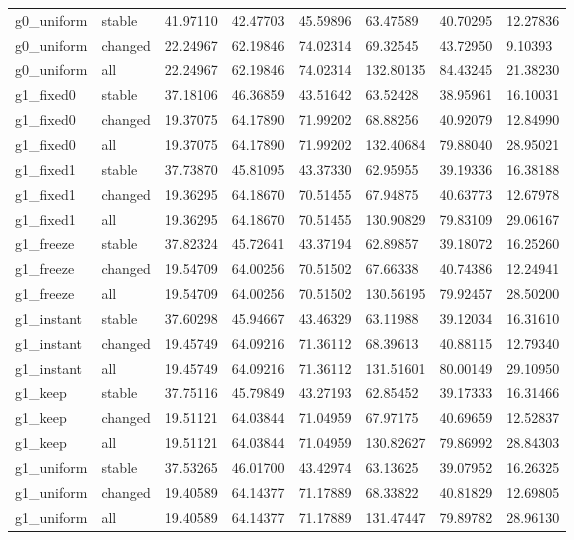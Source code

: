 \begin{longtable}{llllllll}
g0\_uniform & stable & 41.97110 & 42.47703 & 45.59896 & 63.47589 & 40.70295 & 12.27836 \\
g0\_uniform & changed & 22.24967 & 62.19846 & 74.02314 & 69.32545 & 43.72950 & 9.10393 \\
g0\_uniform & all & 22.24967 & 62.19846 & 74.02314 & 132.80135 & 84.43245 & 21.38230 \\
g1\_fixed0 & stable & 37.18106 & 46.36859 & 43.51642 & 63.52428 & 38.95961 & 16.10031 \\
g1\_fixed0 & changed & 19.37075 & 64.17890 & 71.99202 & 68.88256 & 40.92079 & 12.84990 \\
g1\_fixed0 & all & 19.37075 & 64.17890 & 71.99202 & 132.40684 & 79.88040 & 28.95021 \\
g1\_fixed1 & stable & 37.73870 & 45.81095 & 43.37330 & 62.95955 & 39.19336 & 16.38188 \\
g1\_fixed1 & changed & 19.36295 & 64.18670 & 70.51455 & 67.94875 & 40.63773 & 12.67978 \\
g1\_fixed1 & all & 19.36295 & 64.18670 & 70.51455 & 130.90829 & 79.83109 & 29.06167 \\
g1\_freeze & stable & 37.82324 & 45.72641 & 43.37194 & 62.89857 & 39.18072 & 16.25260 \\
g1\_freeze & changed & 19.54709 & 64.00256 & 70.51502 & 67.66338 & 40.74386 & 12.24941 \\
g1\_freeze & all & 19.54709 & 64.00256 & 70.51502 & 130.56195 & 79.92457 & 28.50200 \\
g1\_instant & stable & 37.60298 & 45.94667 & 43.46329 & 63.11988 & 39.12034 & 16.31610 \\
g1\_instant & changed & 19.45749 & 64.09216 & 71.36112 & 68.39613 & 40.88115 & 12.79340 \\
g1\_instant & all & 19.45749 & 64.09216 & 71.36112 & 131.51601 & 80.00149 & 29.10950 \\
g1\_keep & stable & 37.75116 & 45.79849 & 43.27193 & 62.85452 & 39.17333 & 16.31466 \\
g1\_keep & changed & 19.51121 & 64.03844 & 71.04959 & 67.97175 & 40.69659 & 12.52837 \\
g1\_keep & all & 19.51121 & 64.03844 & 71.04959 & 130.82627 & 79.86992 & 28.84303 \\
g1\_uniform & stable & 37.53265 & 46.01700 & 43.42974 & 63.13625 & 39.07952 & 16.26325 \\
g1\_uniform & changed & 19.40589 & 64.14377 & 71.17889 & 68.33822 & 40.81829 & 12.69805 \\
g1\_uniform & all & 19.40589 & 64.14377 & 71.17889 & 131.47447 & 79.89782 & 28.96130 \\
\bottomrule
\end{longtable}
